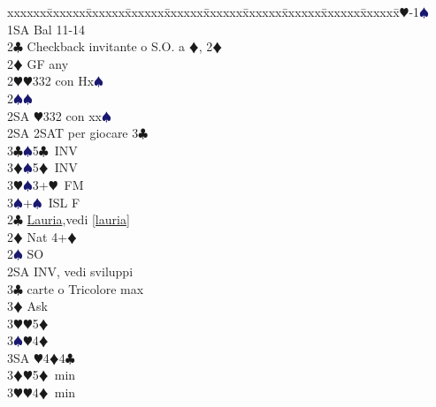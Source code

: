 \documentclass[a4paper,italian]{article}
\newcommand{\BC}{\textcolor{OliveGreen}{$\clubsuit$}}
\newcommand{\BD}{\textcolor{RedOrange}{$\vardiamondsuit$}}
\newcommand{\BH}{\textcolor{Red2}{$\varheartsuit${}}}
\newcommand{\BS}{\textcolor{MidnightBlue}{$\spadesuit${}}}
\newenvironment{bidtable}
{\begin{tabbing}

    xxxxxx\=xxxxxx\=xxxxxx\=xxxxxx\=xxxxxx\=xxxxxx\=xxxxxx\=xxxxxx\=xxxxxx\=xxxxxx\=\kill}
{\end{tabbing} }%
\begin{document}
\begin{multicols*}{2}
                                        \begin{bidtable}
                                            1\BH-1\BS\+\\
                                            1SA \> Bal 11-14\+\\
                                            2\BC \> Checkback invitante o S.O. a \BD , 2\BD \\
                                            2\BD \> GF any\+\\
                                            2\BH {}\BH 332 con Hx\BS \\
                                            2\BS {}\BS \\
                                            2SA \BH 332 con xx\BS \-\\
                                            2SA \> 2SAT per giocare 3\BC \\
                                            3\BC {}\BS 5\BC\ INV\\
                                            3\BD {}\BS 5\BD\ INV\\
                                            3\BH {}\BS 3+\BH\ FM\\
                                            3\BS {}+\BS\ ISL F\-\\
                                            2\BC \> \hyperref[lauria]{Lauria},vedi \ref{lauria}\\
                                            2\BD \> Nat 4+\BD\+\\
                                            2\BS \> SO\\
                                            2SA \> INV, vedi sviluppi\+\\
                                            3\BC {} carte o Tricolore max\+\\
                                            3\BD \> Ask\+\\
                                            3\BH {}\BH 5\BD \\
                                            3\BS {}\BH 4\BD \\
                                            3SA \BH 4\BD 4\BC \-\-\\
                                            3\BD {}\BH 5\BD\ min\\
                                            3\BH {}\BH 4\BD\ min\\

\end{bidtable}
\end{multicols*}
\end{document}
